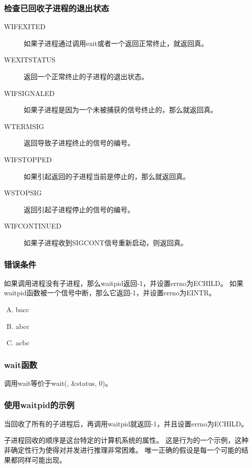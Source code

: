 {{        \subsubsection{检查已回收子进程的退出状态}
        {
            \begin{description}
                \item[WIFEXITED] 如果子进程通过调用exit或者一个返回正常终止，就返回真。
                \item[WEXITSTATUS] 返回一个正常终止的子进程的退出状态。
                \item[WIFSIGNALED] 如果子进程是因为一个未被捕获的信号终止的，那么就返回真。
                \item[WTERMSIG] 返回导致子进程终止的信号的编号。
                \item[WIFSTOPPED] 如果引起返回的子进程当前是停止的，那么就返回真。
                \item[WSTOPSIG]  返回引起子进程停止的信号的编号。
                \item[WIFCONTINUED] 如果子进程收到SIGCONT信号重新启动，则返回真。
            \end{description}
        }

        \subsubsection{错误条件}
        {
            如果调用进程没有子进程，那么waitpid返回-1，并设置errno为ECHILD。
            如果waitpid函数被一个信号中断，那么它返回-1，并设置errno为EINTR。

        \begin{practicec}
            \begin{enumerate}[A.]
                \item bacc
                \item abcc
                \item acbc
            \end{enumerate}
        \end{practicec}
        }

        \subsubsection{wait函数}
        {
            调用wait等价于wait(, \&status, 0)。
        }

        \subsubsection{使用waitpid的示例}
        {
            当回收了所有的子进程后，再调用waitpid就返回-1，并且设置errno为ECHILD。

            子进程回收的顺序是这台特定的计算机系统的属性。
            这是行为的一个示例，这种非确定性行为使得对并发进行推理非常困难。
            唯一正确的假设是每一个可能的结果都同样可能出现。
        }
    }
}
